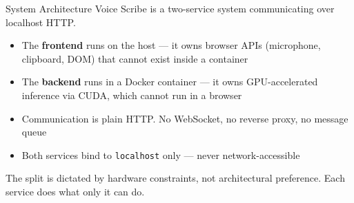 \documentclass{beamer}
\begin{document}
\begin{frame}{System Architecture}
    \small
    Voice Scribe is a two-service system communicating over localhost HTTP.

    \vspace{0.3em}
    \begin{itemize}\setlength{\itemsep}{2pt}
        \item The \textbf{frontend} runs on the host --- it owns browser APIs
              (microphone, clipboard, DOM) that cannot exist inside a container
        \item The \textbf{backend} runs in a Docker container --- it owns
              GPU-accelerated inference via CUDA, which cannot run in a browser
        \item Communication is plain HTTP. No WebSocket, no reverse proxy,
              no message queue
        \item Both services bind to \texttt{localhost} only --- never
              network-accessible
    \end{itemize}

    \vspace{0.2em}
    \begin{block}{}
        The split is dictated by hardware constraints, not architectural
        preference. Each service does what only it can do.
    \end{block}
\end{frame}
\end{document}
